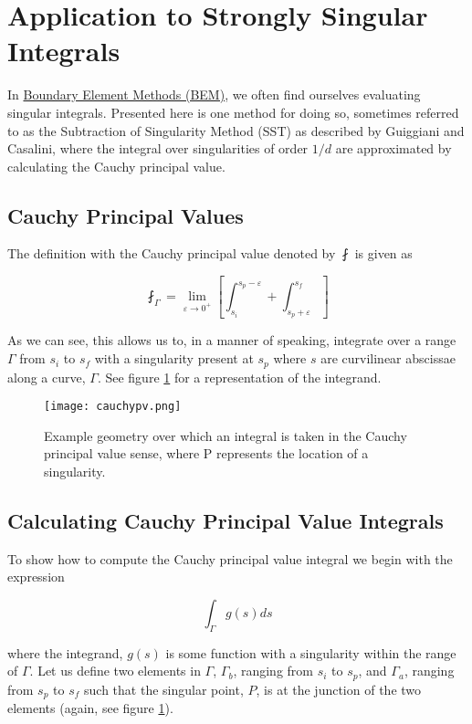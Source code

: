 \section{Application to Strongly Singular Integrals}
In \hyperref[ch:boundaryelementmethod]{Boundary Element Methods (BEM)}, we often find ourselves evaluating singular integrals. Presented here is one method for doing so, sometimes referred to as the Subtraction of Singularity Method (SST) \label{vocab:subtractionofsingularity} as described by Guiggiani and Casalini,\cite{Guiggiani1987Direct-computat} where the integral over singularities of order $1/d$ are approximated by calculating the Cauchy principal value.

\subsection{Cauchy Principal Values}
The definition with the Cauchy principal value denoted by $\fint$ is given as

\begin{equation} \fint_{\Gamma} = \lim_{ \varepsilon \rightarrow 0^+} \left[ \int_{s_i}^{s_p -\varepsilon} + \int_{s_p + \varepsilon}^{s_f}  \right] \end{equation}

As we can see, this allows us to, in a manner of speaking, integrate over a range $\Gamma$ from $s_i$ to $s_f$ with a singularity present at $s_p$ where $s$ are curvilinear abscissae along a curve, $\Gamma$. See figure \ref{fig:cauchypv} for a representation of the integrand.

\begin{figure}[htb]
	\centering
	\texttt{[image: cauchypv.png]}
	\caption{Example geometry over which an integral is taken in the Cauchy principal value sense, where P represents the location of a singularity.\cite{Guiggiani1987Direct-computat}}
	\label{fig:cauchypv}
\end{figure}

\subsection{Calculating Cauchy Principal Value Integrals}
To show how to compute the Cauchy principal value integral we begin with the expression

\begin{equation}
\int_{\Gamma} g(s) ds
\end{equation}

where the integrand, $g(s)$ is some function with a singularity within the range of $\Gamma$. Let us define two elements in $\Gamma$, $\Gamma_b$, ranging from $s_i$ to $s_p$, and $\Gamma_a$, ranging from $s_p$ to $s_f$ such that the singular point, $P$, is at the junction of the two elements (again, see figure \ref{fig:cauchypv}).

